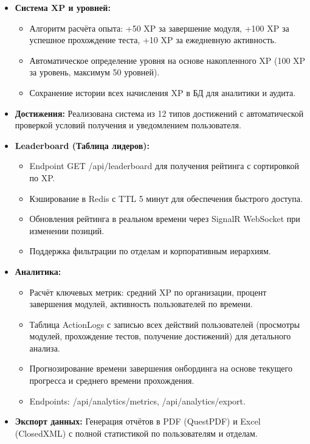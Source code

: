 \begin{itemize}
	\item \textbf{Система XP и уровней:} 
	\begin{itemize}
		\item Алгоритм расчёта опыта: +50 XP за завершение модуля, +100 XP за успешное прохождение теста, +10 XP за ежедневную активность.
		\item Автоматическое определение уровня на основе накопленного XP (100 XP за уровень, максимум 50 уровней).
		\item Сохранение истории всех начисления XP в БД для аналитики и аудита.
	\end{itemize}
	
	\item \textbf{Достижения:} Реализована система из 12 типов достижений с автоматической проверкой условий получения и уведомлением пользователя.
	
	\item \textbf{Leaderboard (Таблица лидеров):}
	\begin{itemize}
		\item Endpoint GET /api/leaderboard для получения рейтинга с сортировкой по XP.
		\item Кэширование в Redis с TTL 5 минут для обеспечения быстрого доступа.
		\item Обновления рейтинга в реальном времени через SignalR WebSocket при изменении позиций.
		\item Поддержка фильтрации по отделам и корпоративным иерархиям.
	\end{itemize}
	
	\item \textbf{Аналитика:} 
	\begin{itemize}
		\item Расчёт ключевых метрик: средний XP по организации, процент завершения модулей, активность пользователей по времени.
		\item Таблица ActionLogs с записью всех действий пользователей (просмотры модулей, прохождение тестов, получение достижений) для детального анализа.
		\item Прогнозирование времени завершения онбординга на основе текущего прогресса и среднего времени прохождения.
		\item Endpoints: /api/analytics/metrics, /api/analytics/export.
	\end{itemize}
	
	\item \textbf{Экспорт данных:} Генерация отчётов в PDF (QuestPDF) и Excel (ClosedXML) с полной статистикой по пользователям и отделам.
\end{itemize}

